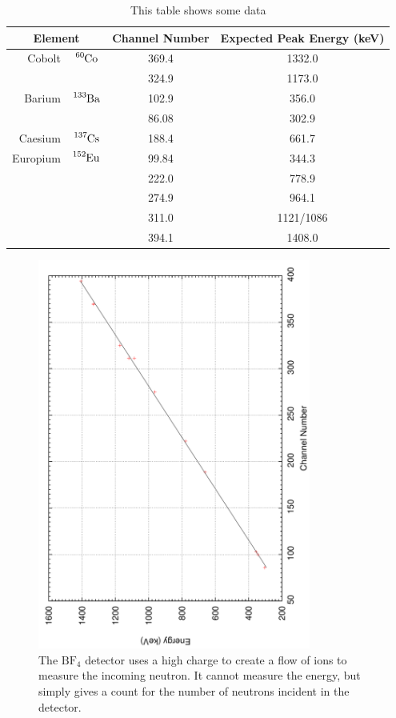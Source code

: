 \begin{table}[ht]
	\centering
	\begin{tabular}{r c|c|c}
		\multicolumn{2}{c|}{Element} & Channel Number & Expected Peak Energy (keV) \\
		\hline\hline
		Cobolt 		& $\ce{^{60}Co}$  & 369.4	& 1332.0 \\
					&				  & 324.9	& 1173.0	\\
		\hline
		Barium		& $\ce{^{133}Ba}$ & 102.9	& 356.0	\\
					&				  & 86.08	& 302.9		\\
		\hline
		Caesium		& $\ce{^{137}Cs}$ & 188.4	& 661.7 \\
		\hline
		Europium	& $\ce{^{152}Eu}$ & 99.84	& 344.3 \\
					&				  & 222.0	& 778.9		\\
					&				  & 274.9	& 964.1		\\
					&				  & 311.0	& 1121/1086	\\
					&				  & 394.1	& 1408.0	
	\end{tabular}
	\caption{This table shows some data\label{tab:myfirsttable}}
\end{table}

\begin{figure}[ht]
	\centering
	\includegraphics[angle=270,width=0.8\textwidth]{calibration1NaI.pdf}
	\caption{The $\text{BF}_4$ detector uses a high charge to create a flow of ions to measure the incoming neutron. It cannot measure the energy, but simply gives a count for the number of neutrons incident in the detector.\label{fig:bf3detector}}
\end{figure}

